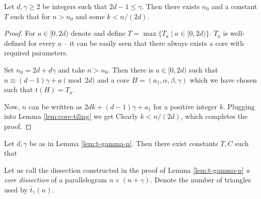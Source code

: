 \begin{lem}
\label{lem:t-gamma-n}

Let $d,\gamma \geq 2$ be integers such that $2d-1 \leq \gamma$. Then there exists $n_0$ and a constant $T$ such that
%
for $n > n_0$ and some $k < n/(2d)$.
\end{lem}
\begin{proof}
For $a \in [0,2d)$ denote
%
and define $T = \max \{T_a \mid a \in [0,2d)\}$. $T_a$ is well-defined for every $a$ -- it can be easily seen that there always exists a core with required parameters.

Set $n_0 = 2d+d\gamma$ and take $n > n_0$. Then there is $a \in [0,2d)$ such that $n \equiv (d-1)\gamma + a \pmod{2d}$ and a core $H=(a_1,\alpha,\beta,\gamma)$ which we have chosen such that $t(H) = T_a$.

Now, $n$ can be written as $2dk + (d-1)\gamma + a_1$ for a positive integer $k$. Plugging into Lemma \ref{lem:core-tiling} we get
%
Clearly $k < n/(2d)$, which completes the proof.
\end{proof}

\begin{cor}
\label{cor:log-t-gamma-n}
Let $d,\gamma$ be as in Lemma \ref{lem:t-gamma-n}. Then there exist constants $T,C$ such that
%
\end{cor}%

\begin{defn}
Let us call the dissection constructed in the proof of Lemma \ref{lem:t-gamma-n} \emph{a core dissection} of a parallelogram $n \times (n+\gamma)$. Denote the number of triangles used by $\bar t_\gamma(n)$.
\end{defn}

